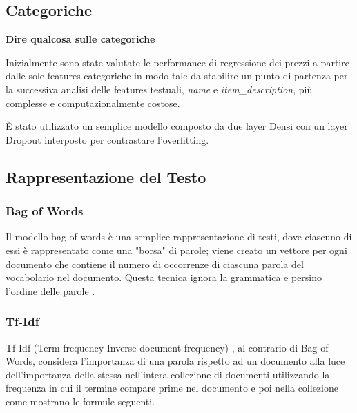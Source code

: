 \subsection{Categoriche}
\textbf{Dire qualcosa sulle categoriche}

Inizialmente sono state valutate le performance di regressione dei prezzi a
partire dalle sole features categoriche in modo tale da stabilire un punto di
partenza per la successiva analisi delle features testuali, \textit{name} e
\textit{item\_description}, più complesse e computazionalmente costose.

È stato utilizzato un semplice modello composto da due layer Densi con un layer
Dropout interposto per contrastare l'overfitting.



\subsection{Rappresentazione del Testo}

\subsubsection{Bag of Words}
Il modello bag-of-words è una semplice rappresentazione di testi, dove ciascuno
di essi è rappresentato come una "borsa" di parole; viene creato un vettore per
ogni documento che contiene il numero di occorrenze di ciascuna parola del
vocabolario nel documento. Questa tecnica ignora la grammatica e persino
l'ordine delle parole \cite{manning_raghavan_schutze_2008}.

\subsubsection{Tf-Idf}\label{section-tfidf} Tf-Idf (Term frequency-Inverse
document frequency) \cite{manning_raghavan_schutze_2008}, al contrario di Bag of
Words, considera l'importanza di una parola rispetto ad un documento alla luce
dell'importanza della stessa nell'intera collezione di documenti utilizzando la
frequenza in cui il termine compare prime nel documento e poi nella collezione
come mostrano le formule seguenti.%

